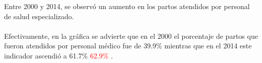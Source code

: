  Entre 2000 y 2014, se observó un aumento en los partos atendidos por personal de salud especializado.\\\\ Efectivamente,  en la gráfica se advierte que   en el 2000  el porcentaje de partos que fueron atendidos por personal médico fue de  39.9\%  mientras que en el 2014 este indicador ascendió a 61.7\% \textcolor{red}{62.9\%} . 